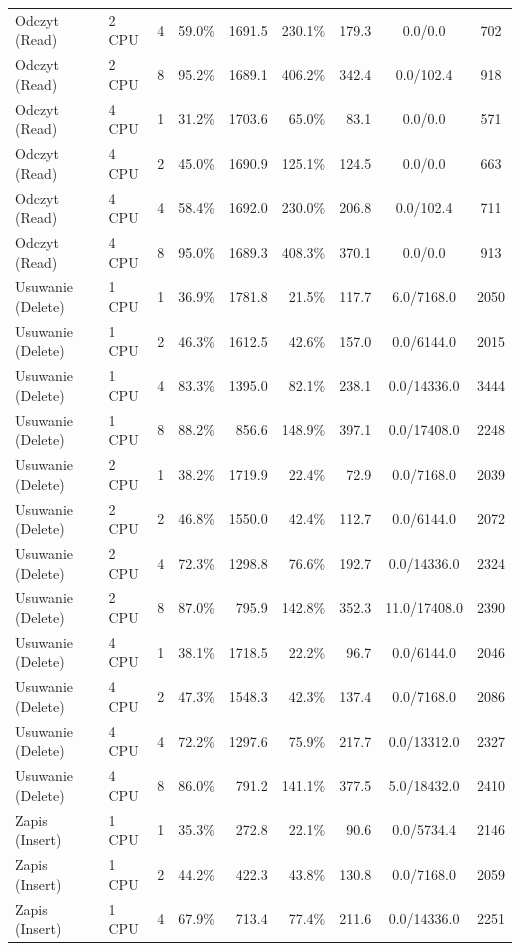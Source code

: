 \begin{table}[ht]
{\begin{tabular}{llcrrrrcc}
Odczyt (Read) & 2 CPU & 4 & 59.0\% & 1691.5 & 230.1\% & 179.3 & 0.0/0.0 & 702 \\
Odczyt (Read) & 2 CPU & 8 & 95.2\% & 1689.1 & 406.2\% & 342.4 & 0.0/102.4 & 918 \\
Odczyt (Read) & 4 CPU & 1 & 31.2\% & 1703.6 & 65.0\% & 83.1 & 0.0/0.0 & 571 \\
Odczyt (Read) & 4 CPU & 2 & 45.0\% & 1690.9 & 125.1\% & 124.5 & 0.0/0.0 & 663 \\
Odczyt (Read) & 4 CPU & 4 & 58.4\% & 1692.0 & 230.0\% & 206.8 & 0.0/102.4 & 711 \\
Odczyt (Read) & 4 CPU & 8 & 95.0\% & 1689.3 & 408.3\% & 370.1 & 0.0/0.0 & 913 \\
Usuwanie (Delete) & 1 CPU & 1 & 36.9\% & 1781.8 & 21.5\% & 117.7 & 6.0/7168.0 & 2050 \\
Usuwanie (Delete) & 1 CPU & 2 & 46.3\% & 1612.5 & 42.6\% & 157.0 & 0.0/6144.0 & 2015 \\
Usuwanie (Delete) & 1 CPU & 4 & 83.3\% & 1395.0 & 82.1\% & 238.1 & 0.0/14336.0 & 3444 \\
Usuwanie (Delete) & 1 CPU & 8 & 88.2\% & 856.6 & 148.9\% & 397.1 & 0.0/17408.0 & 2248 \\
Usuwanie (Delete) & 2 CPU & 1 & 38.2\% & 1719.9 & 22.4\% & 72.9 & 0.0/7168.0 & 2039 \\
Usuwanie (Delete) & 2 CPU & 2 & 46.8\% & 1550.0 & 42.4\% & 112.7 & 0.0/6144.0 & 2072 \\
Usuwanie (Delete) & 2 CPU & 4 & 72.3\% & 1298.8 & 76.6\% & 192.7 & 0.0/14336.0 & 2324 \\
Usuwanie (Delete) & 2 CPU & 8 & 87.0\% & 795.9 & 142.8\% & 352.3 & 11.0/17408.0 & 2390 \\
Usuwanie (Delete) & 4 CPU & 1 & 38.1\% & 1718.5 & 22.2\% & 96.7 & 0.0/6144.0 & 2046 \\
Usuwanie (Delete) & 4 CPU & 2 & 47.3\% & 1548.3 & 42.3\% & 137.4 & 0.0/7168.0 & 2086 \\
Usuwanie (Delete) & 4 CPU & 4 & 72.2\% & 1297.6 & 75.9\% & 217.7 & 0.0/13312.0 & 2327 \\
Usuwanie (Delete) & 4 CPU & 8 & 86.0\% & 791.2 & 141.1\% & 377.5 & 5.0/18432.0 & 2410 \\
Zapis (Insert) & 1 CPU & 1 & 35.3\% & 272.8 & 22.1\% & 90.6 & 0.0/5734.4 & 2146 \\
Zapis (Insert) & 1 CPU & 2 & 44.2\% & 422.3 & 43.8\% & 130.8 & 0.0/7168.0 & 2059 \\
Zapis (Insert) & 1 CPU & 4 & 67.9\% & 713.4 & 77.4\% & 211.6 & 0.0/14336.0 & 2251 \\

\end{tabular}}
\end{table}
